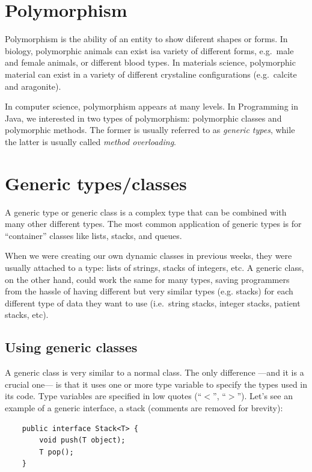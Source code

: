 \section{Polymorphism}
\label{sec:polymorphyism}

Polymorphism is the ability of an entity to show diferent shapes or
forms. In biology, polymorphic animals can exist isa variety of
different forms, e.g.~male and female animals, or different blood
types. In materials science, polymorphic material can exist in a
variety of different crystaline configurations (e.g.~calcite and
aragonite). 

In computer science, polymorphism appears at many levels. In
Programming in Java, we interested in two types of polymorphism:
polymorphic classes and polymorphic methods. The former is usually
referred to as \emph{generic types}, while the latter is usually
called \emph{method overloading}. 

\section{Generic types/classes}
\label{sec:generic-types}

A generic type or generic class
is a complex type that can be combined with many other
different types. The most common application of generic types is for
``container'' classes like lists, stacks, and queues. 

When we were creating our own dynamic classes in previous weeks, they
were usually attached to a type: lists of strings, stacks of integers,
etc. A generic class, on the other hand, could work the same for many
types, saving programmers from the hassle of having different but very
similar types (e.g. stacks) for each different type of data they want
to use (i.e.~string stacks, integer stacks, patient stacks, etc). 

\subsection{Using generic classes}
\label{sec:using-gener-class}

A generic class is very similar to a normal class. The only
difference ---and it is a crucial one--- is that it uses one or more
type variable to specify the types used in its code. Type variables
are specified in low quotes (``$<$'', ``$>$''). Let's see an
example of a generic interface, a stack (comments are removed for
brevity): 

\begin{verbatim}
    public interface Stack<T> {
        void push(T object);
        T pop();
    }
\end{verbatim}

